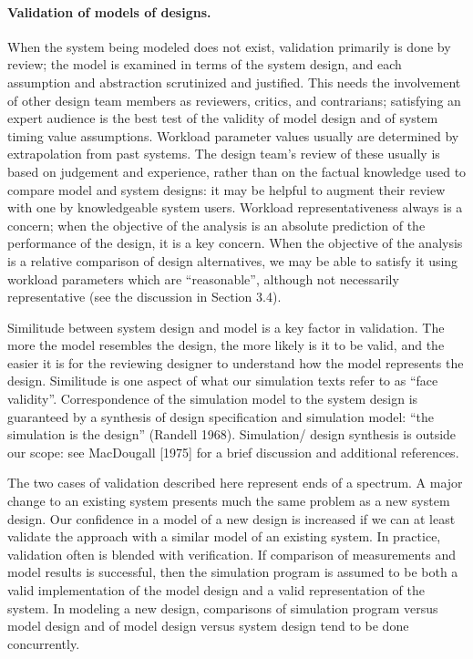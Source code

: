\paragraph{Validation of models of designs.}
When the system being modeled does not exist, validation primarily is done by
review; the model is examined in terms of the system design, and each
assumption and abstraction scrutinized and justified. This needs the
involvement of other design team members as reviewers, critics, and
contrarians; satisfying an expert audience is the best test of the validity of
model design and of system timing value assumptions. Workload parameter values
usually are determined by extrapolation from past systems. The design team's
review of these usually is based on judgement and experience, rather than on
the factual knowledge used to compare model and system designs: it may be
helpful to augment their review with one by knowledgeable system users.
Workload representativeness always is a concern; when the objective of the
analysis is an absolute prediction of the performance of the design, it is a
 key concern. When the objective of the analysis is a relative comparison of
design alternatives, we may be able to satisfy it using workload parameters
which are ``reasonable'', although not necessarily representative (see the
discussion in Section 3.4).

Similitude between system design and model is a key factor in validation. The
more the model resembles the design, the more likely is it to be valid, and
the easier it is for the reviewing designer to understand how the model
represents the design. Similitude is one aspect of what our simulation texts
refer to as ``face validity''. Correspondence of the simulation model to the
system design is guaranteed by a synthesis of design specification and
simulation model: ``the simulation is the design'' (Randell 1968). Simulation/
design synthesis is outside our scope: see MacDougall [1975] for a brief
discussion and additional references.

The two cases of validation described here represent ends of a spectrum. A
major change to an existing system presents much the same problem as a new
system design. Our confidence in a model of a new design is increased if we
can at least validate the approach with a similar model of an existing system.
In practice, validation often is blended with verification. If comparison of
measurements and model results is successful, then the simulation program is
assumed to be both a valid implementation of the model design and a valid
representation of the system. In modeling a new design, comparisons of
simulation program versus model design and of model design versus system
design tend to be done concurrently.

